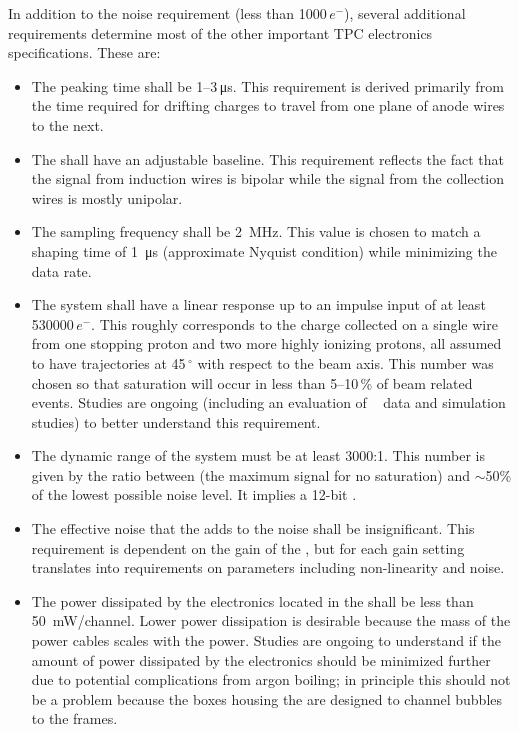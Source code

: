In addition to the noise requirement (less than \num{1000}\,$e^{-}$), several additional requirements determine most of the other important TPC electronics specifications.  These are:

\begin{itemize}
\item{The  peaking time shall %
be \numrange{1}{3}\,\si{\micro\second}.  This requirement is derived primarily from the time required for drifting charges to travel from one plane of anode wires to the next.}
\item{The  shall %
 have an adjustable baseline.  This requirement reflects the fact that the signal from induction wires is bipolar while the signal from the collection wires is mostly unipolar.}
\item{The  sampling frequency shall %
be \SI{2}{MHz}.  This value is chosen to match a  shaping time of \SI{1}{\micro\second} (approximate Nyquist condition) while minimizing the data rate.}
\item{The system shall %
have a linear response up to an impulse input of at least \num{530000}\,$e^{-}$.  This roughly corresponds to the charge collected on a single wire from one stopping proton and two more highly ionizing protons, all assumed to have trajectories at \num{45}\,$^{\circ}$ with respect to the beam axis.  This number was chosen so that saturation will occur in less than \numrange{5}{10}\,\% of beam related events.  Studies are ongoing (including an evaluation of \lariat~\cite{Cavanna:2014iqa} data and simulation studies) to better understand this requirement.}
\item{The dynamic range of the system must be at least \num{3000}:\num{1}. This number is given by the ratio between (the maximum signal for no saturation) and $\sim$50\% of the lowest possible noise level.  It implies a \num{12}-bit .}
\item{The effective noise that the  adds to the  noise shall %
be insignificant.  This requirement is dependent on the gain of the , but for each gain setting translates into requirements on  parameters including non-linearity and noise.}
\item{The power dissipated by the electronics located in the \lar shall %
be less than \SI{50}{mW/channel}.  Lower power dissipation is desirable because the mass of the power cables scales with the power.  Studies are ongoing to understand if the amount of power dissipated by the electronics should be minimized further due to potential complications from argon boiling; in principle this should not be a problem because the  boxes housing the  are designed to channel bubbles to the  frames.}
\end{itemize}

